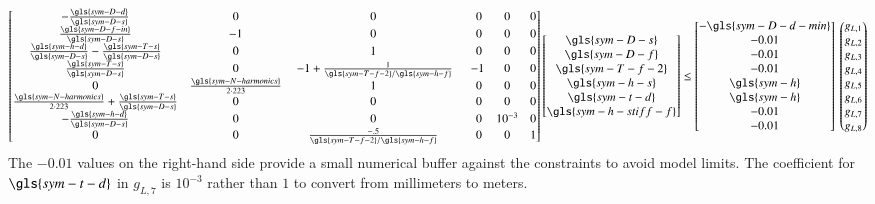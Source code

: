 \begin{equation}
    \begin{bmatrix}
    -\frac{\gls{sym-D-d}}{\gls{sym-D-s}} & 0 & 0 & ~~~0 & 0 & 0\\
    \frac{\gls{sym-D-f-in}}{\gls{sym-D-s}} & -1 & 0 & ~~~0& 0  & 0\\
    \frac{\gls{sym-h-d}}{\gls{sym-D-s}}-\frac{\gls{sym-T-s}}{\gls{sym-D-s}} & 0 & 1 & ~~~0& 0  & 0\\
    \frac{\gls{sym-T-s}}{\gls{sym-D-s}} & 0 & ~-1+\frac{1}{\gls{sym-T-f-2}/\gls{sym-h-f}} & ~~-1 & 0 & 0\\
    0 & \frac{\gls{sym-N-harmonics}}{2\cdot223} & 1 & ~~~0& 0  & 0\\
    \frac{\gls{sym-N-harmonics}}{2\cdot223}  + \frac{\gls{sym-T-s}}{\gls{sym-D-s}} & 0 & 0 & ~~~0 & 0 & 0\\
    -\frac{\gls{sym-h-d}}{\gls{sym-D-s}} & 0 & 0 & ~~~0 & 10^{-3} & 0\\
    0 & 0 & \frac{-.5}{\gls{sym-T-f-2}/\gls{sym-h-f}} & ~~~0 & 0 & 1 \\
    \end{bmatrix}
    \begin{bmatrix} \gls{sym-D-s} \\ \gls{sym-D-f} \\ \gls{sym-T-f-2} \\ \gls{sym-h-s} \\ \gls{sym-t-d} \\ \gls{sym-h-stiff-f}
    \end{bmatrix}
    \leq
    \begin{bmatrix}
    -\gls{sym-D-d-min} \\ -0.01 \\ -0.01 \\ -0.01 \\ \gls{sym-h} \\ \gls{sym-h} \\ -0.01 \\ -0.01
    \end{bmatrix}~
    \begin{pmatrix}
    g_{L,1} \\ g_{L,2} \\ g_{L,3} \\ g_{L,4} \\ g_{L,5} \\ g_{L,6} \\ g_{L,7} \\ g_{L,8}
    \end{pmatrix}
\end{equation}
The $-0.01$ values on the right-hand side provide a small numerical buffer against the constraints to avoid model limits.
The coefficient for $\gls{sym-t-d}$ in $g_{L,7}$ is $10^{-3}$ rather than $1$ to convert from millimeters to meters.


